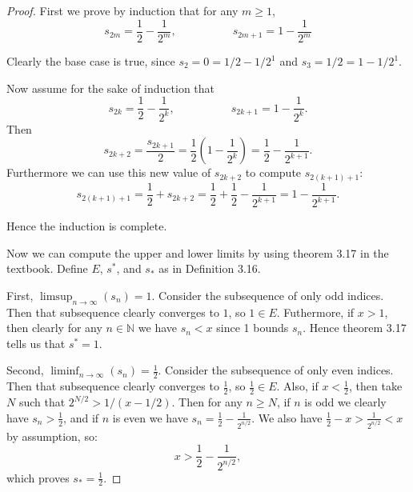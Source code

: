 \documentclass[12pt]{article}
\theoremstyle{remark}
\theoremstyle{named}
\begin{document}
\begin{proof}
    First we prove by induction that for any \(m \ge 1\),
    \[s_{2m} = \frac{1}{2} - \frac{1}{2^m}, \hspace{5em} s_{2m + 1} = 1 - \frac{1}{2^m}\]

    Clearly the base case is true, since \(s_{2} = 0 = 1/2 - 1/2^1\) and \(s_3 = 1/2 = 1 - 1/2^1\).

    Now assume for the sake of induction that 
    \[s_{2k} = \frac{1}{2} - \frac{1}{2^k}, \hspace{5em} s_{2k + 1} = 1 - \frac{1}{2^k}.\]
    Then 
    \[s_{2k + 2} = \frac{s_{2k + 1}}{2} = \frac{1}{2}\left(1 - \frac{1}{2^k}\right) = \frac{1}{2} - \frac{1}{2^{k + 1}}.\]
    Furthermore we can use this new value of \(s_{2k + 2}\) to compute \(s_{2(k + 1) + 1}\):
    \[s_{2(k + 1) + 1} = \frac{1}{2} + s_{2k + 2} = \frac{1}{2} + \frac{1}{2} - \frac{1}{2^{k + 1}} = 1 - \frac{1}{2^{k + 1}}.\]

    Hence the induction is complete.

    Now we can compute the upper and lower limits by using theorem 3.17 in the textbook. Define \(E\), \(s^*\), and \(s_*\) as in Definition 3.16.

    First, \(\limsup_{n \to \infty}(s_n) = 1\). Consider the subsequence of only odd indices. Then that subsequence clearly converges to \(1\), so \(1 \in E\). Futhermore, if \(x > 1\), then clearly for any \(n \in \mathbb N\) we have \(s_n < x\) since 1 bounds \(s_n\). Hence theorem 3.17 tells us that \(s^* = 1\).
    
    Second, \(\liminf_{n \to \infty}(s_n) = \frac{1}{2}\). Consider the subsequence of only even indices. Then that subsequence clearly converges to \(\frac{1}{2}\), so \(\frac{1}{2} \in E\). Also, if \(x < \frac{1}{2}\), then take \(N\) such that \(2^{N/2} > 1/ (x - 1/2)\). Then for any \(n \ge N\), if \(n\) is odd we clearly have \(s_n > \frac{1}{2}\), and if \(n\) is even we have \(s_n = \frac{1}{2} - \frac{1}{2^{n/2}}\). We also have \(\frac{1}{2} - x > \frac{1}{2^{n/2}} < x\) by assumption, so: 
    \[x > \frac{1}{2} - \frac{1}{2^{n/2}},\]
    which proves \(s_* = \frac{1}{2}\).
\end{proof}
\end{document}
